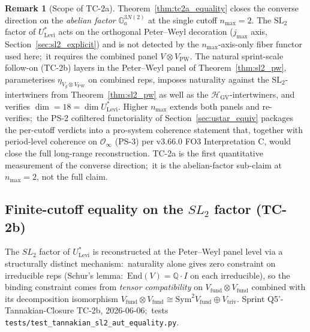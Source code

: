 \documentclass[11pt,a4paper]{article}
\theoremstyle{plain}
\theoremstyle{definition}
\newtheorem{remark}[theorem]{Remark}
\newcommand{\nmax}{n_{\max}}
\newcommand{\HGV}{\mathcal{H}_{\mathrm{GV}}}
\newcommand{\Ginf}{\mathcal{O}_{\infty}}
\newcommand{\End}{\mathrm{End}}
\newcommand{\SL}{\mathrm{SL}}
\newcommand{\Ga}{\mathbb{G}_{a}}
\newcommand{\Q}{\mathbb{Q}}
\newcommand{\Ulev}{U^{*}_{\mathrm{Levi}}}
\begin{document}
\begin{remark}[Scope of TC-2a]\label{rem:tc2a_scope}
Theorem~\ref{thm:tc2a_equality} closes the converse direction on
the \emph{abelian factor} $\Ga^{3 N(2)}$ at the single cutoff
$\nmax = 2$. The $\SL_{2}$ factor of $\Ulev$ acts on the orthogonal
Peter--Weyl decoration ($j_{\max}$ axis,
Section~\ref{sec:sl2_explicit}) and is not detected by the
$\nmax$-axis-only fiber functor used here;\ it requires the
combined panel $V \otimes V_{\mathrm{PW}}$. The natural sprint-scale
follow-on (TC-2b) layers in the Peter--Weyl panel of
Theorem~\ref{thm:sl2_pw}, parameterises $\eta_{V_{g} \otimes
V_{\mathrm{PW}}}$ on combined reps, imposes naturality against the
$\SL_{2}$-intertwiners from Theorem~\ref{thm:sl2_pw} as well as the
$\HGV$-intertwiners, and verifies $\dim = 18 = \dim \Ulev$. Higher
$\nmax$ extends both panels and re-verifies;\ the PS-2 cofiltered
functoriality of Section~\ref{sec:ustar_equiv} packages the per-cutoff
verdicts into a pro-system coherence statement that, together with
period-level coherence on $\Ginf$ (PS-3) per v3.66.0 FO3
Interpretation C, would close the full long-range reconstruction.
TC-2a is the first quantitative measurement of the converse
direction;\ it is the abelian-factor sub-claim at $\nmax = 2$, not
the full claim.
\end{remark}

\subsection{Finite-cutoff equality on the $SL_{2}$ factor (TC-2b)}\label{sec:tc2b_sl2_equality}

The $SL_{2}$ factor of $\Ulev$ is reconstructed at the Peter--Weyl
panel level via a structurally distinct mechanism:\ naturality alone
gives zero constraint on irreducible reps (Schur's lemma:\
$\End(V) = \Q \cdot I$ on each irreducible), so the binding
constraint comes from \emph{tensor compatibility} on
$V_{\mathrm{fund}} \otimes V_{\mathrm{fund}}$ combined with its
decomposition isomorphism
$V_{\mathrm{fund}} \otimes V_{\mathrm{fund}} \cong
\mathrm{Sym}^{2} V_{\mathrm{fund}} \oplus V_{\mathrm{triv}}$. Sprint
Q5'-Tannakian-Closure TC-2b, 2026-06-06;\ tests \texttt{tests/test\_tannakian\_sl2\_aut\_equality.py}.
\end{document}
